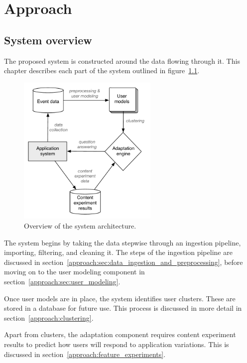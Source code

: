 \chapter{Approach}

\label{Chapter3}


\section{System overview} %
\label{approach:sec:system_overview}

The proposed system is constructed around the data flowing through it. This chapter describes each part of the system outlined in figure~\ref{fig:system-architecture}.

\begin{figure}[b]
  \centering
    \includegraphics[width=0.6\textwidth]{Figures/system-architecture}
    \caption{Overview of the system architecture.}
    \label{fig:system-architecture}
\end{figure}

The system begins by taking the data stepwise through an ingestion pipeline, importing, filtering, and cleaning it. The steps of the ingestion pipeline are discussed in section~\ref{approach:sec:data_ingestion_and_preprocessing}, before moving on to the user modeling component in section~\ref{approach:sec:user_modeling}.

Once user models are in place, the system identifies user clusters. These are stored in a database for future use. This process is discussed in more detail in section~\ref{approach:clustering}.

Apart from clusters, the adaptation component requires content experiment results to predict how users will respond to application variations. This is discussed in section~\ref{approach:feature_experiments}.

